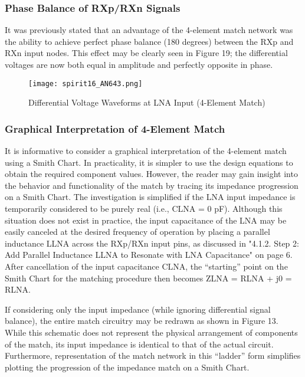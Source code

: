       \subsubsection{Phase Balance of RXp/RXn Signals}
        It was previously stated that an advantage of the 4-element match network was the ability 
        to achieve perfect phase balance (180 degrees) between the RXp and RXn input nodes. This 
        effect may be clearly seen in Figure 19; the differential voltages are now both equal in 
        amplitude and perfectly opposite in phase.
        
        \begin{figure}[ht!] %
          \centering
          \texttt{[image: spirit16\_AN643.png]}
          \caption{Differential Voltage Waveforms at LNA Input (4-Element Match) 
                   \cite[s.~16]{AN643SiliconLabs}}
          \label{EXP001:fig_spirit16}
        \end{figure}
        
      \subsubsection{Graphical Interpretation of 4-Element Match}
        It is informative to consider a graphical interpretation of the 4-element match using a 
        Smith Chart. In practicality, it is simpler to use the design equations to obtain the 
        required component values. However, the reader may gain insight into the behavior and 
        functionality of the match by tracing its impedance progression on a Smith Chart. The 
        investigation is simplified if the LNA input impedance is temporarily considered to be 
        purely real (i.e., CLNA = 0 pF). Although this situation does not exist in practice, the 
        input capacitance of the LNA may be easily canceled at the desired frequency of 
        operation by placing a parallel inductance LLNA across the RXp/RXn input pins, as discussed 
        in "4.1.2. Step 2: Add Parallel Inductance LLNA to Resonate with LNA Capacitance" on page 
        6. After cancellation of the input capacitance CLNA, the “starting” point on the Smith 
        Chart for the matching procedure then becomes ZLNA = RLNA + j0 = RLNA.
        
        If considering only the input impedance (while ignoring differential signal balance), the 
        entire match circuitry may be redrawn as shown in Figure 13. While this schematic does not 
        represent the physical arrangement of components of the match, its input impedance is 
        identical to that of the actual circuit. Furthermore, representation of the match network 
        in this “ladder” form simplifies plotting the progression of the impedance match on a Smith 
        Chart.
        
